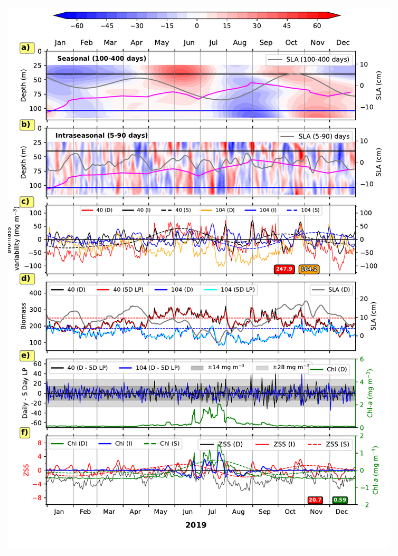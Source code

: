 \documentclass[authoryear,review,11pt]{elsarticle}
\providecommand{\DIFaddbeginFL}{} %
\providecommand{\DIFaddendFL}{} %
\providecommand{\DIFdelbeginFL}{} %
\providecommand{\DIFdelendFL}{} %
\begin{document}
\begin{figure}[htbp]
	\begin{adjustwidth}{-0.5in}{0in} 
		\centering
		\DIFdelbeginFL %
\DIFdelendFL \DIFaddbeginFL \includegraphics[width=0.9\textwidth]{./fig_11_biomass_intra_2019_kollam.pdf} 
		\DIFaddendFL \captionsetup{justification=justified,font=footnotesize,skip=0.05\baselineskip,width=\textwidth}

\end{adjustwidth}
\end{figure}
\end{document}
